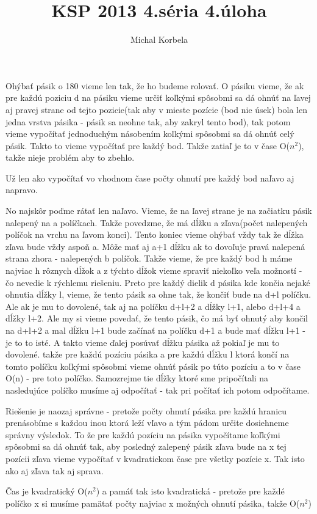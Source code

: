 \documentclass[a4paper,11pt]{article}
\title{KSP 2013 4.séria 4.úloha}
\author{Michal Korbela}
\begin{document}
Ohýbať pásik o 180 vieme len tak, že ho budeme rolovať.
O pásiku vieme, že ak pre každú poziciu d na pásiku vieme určiť koľkými spôsobmi sa dá ohnúť na ľavej aj pravej strane od tejto pozicie(tak aby v mieste pozície (bod nie úsek) bola len jedna vrstva pásika - pásik sa neohne tak, aby zakryl tento bod), tak potom vieme vypočítať jednoduchým násobením koľkými spôsobmi sa dá ohnúť celý pásik. Takto to vieme vypočítať pre každý bod. Takže zatiaľ je to v čase O($n^2$), takže nieje problém aby to zbehlo.

Už len ako vypočítať vo vhodnom čase počty ohnutí pre každý bod naľavo aj napravo.

No najskôr poďme rátať len naľavo. Vieme, že na ľavej strane je na začiatku pásik nalepený na a políčkach. Takže povedzme, že má dĺžku a zľava(počet nalepených políčok na vrchu na ľavom konci). Tento koniec vieme ohýbať vždy tak že dĺžka zľava bude vždy aspoň a. Môže mať aj a+1 dĺžku ak to dovoľuje pravá nalepená strana zhora - nalepených b políčok. Takže vieme, že pre každý bod h máme najviac h rôznych dĺžok a z týchto dĺžok vieme spraviť niekoľko veľa možností - čo nevedie k rýchlemu riešeniu. Preto pre každý dielik d pásika kde končia nejaké ohnutia dĺžky l, vieme, že tento pásik sa ohne tak, že končiť bude na d+l políčku. Ale ak je mu to dovolené, tak aj na políčku d+l+2 a dĺžky l+1, alebo d+l+4 a dĺžky l+2. Ale my si vieme povedať, že tento pásik, čo má byť ohnutý aby končil na d+l+2 a mal dĺžku l+1 bude začínať na políčku d+1 a bude mať dĺžku l+1 - je to to isté. A takto vieme ďalej posúvať dĺžku pásika až pokiaľ je mu to dovolené. takže pre každú pozíciu pásika a pre každú dĺžku l ktorá končí na tomto políčku koľkými spôsobmi vieme ohnúť pásik po túto pozíciu a to v čase O(n) - pre toto políčko. Samozrejme tie dĺžky ktoré sme pripočítali na nasledujúce políčko musíme aj odpočítať - tak pri počítať ich potom odpočítame.

Riešenie je naozaj správne - pretože počty ohnutí pásika pre každú hranicu prenásobíme s každou inou ktorá leží vľavo a tým pádom určite dosiehneme správny výsledok. To že pre každú pozíciu na pásika vypočítame koľkými spôsobmi sa dá ohnúť tak, aby posledný zalepený pásik zľava bude na x tej pozícii zľava vieme vypočítať v kvadratickom čase pre všetky pozície x. Tak isto ako aj zľava tak aj sprava.

Čas je kvadratický O($n^2$)
a pamáť tak isto kvadratická - pretože pre každé políčko x si musíme pamätať počty najviac x možných ohnutí pásika, takže O($n^2$)
\end{document}
